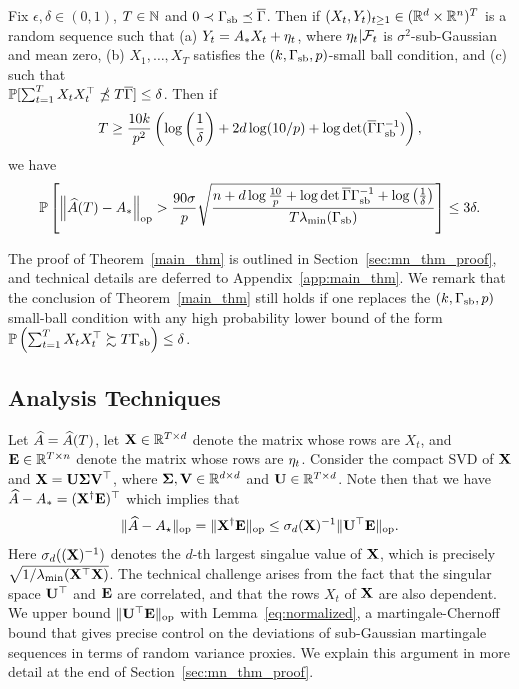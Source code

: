 \begin{thm}\label{main_thm} Fix $\epsilon, \delta \in (0,1)$, $T \in \mathbb{N}$ and $0 \prec \Gamma_{\mathrm{sb}} \preceq \overline{\Gamma}$. Then if $(X_t,Y_t)_{t \ge 1} \in (\mathbb{R}^d \times \mathbb{R}^n)^{T}$ is a random sequence such that (a) $Y_t = A_{*} X_t + \eta_t$, where $\eta_t | \mathcal{F}_t$ is $\sigma^2$-sub-Gaussian and mean zero, (b) $X_1,\dots,X_T$ satisfies the $(k,\Gamma_{\mathrm{sb}},p)$-small ball condition, and (c) such that\\ $\mathbb{P}[\sum_{t = 1}^T X_t X_t^\top \npreceq T\overline{\Gamma}] \le \delta$. Then if 
\begin{align}\label{eq:main_thm_condition}
T \geq  \frac{10k}{p^2}\left(\log \left(\frac{1}{\delta}\right) + 2d\log(10/ p) +  \log \det (\overline{\Gamma} \Gamma_{\mathrm{sb}}^{-1}) \right),
\end{align}
we have
\begin{align}
\mathbb{P}\left[\left\lVert \widehat{A}(T)-A_{*} \right\rVert_{\mathrm{op}} >\frac{90\sigma}{p}\sqrt{\frac{n + d\log \frac{10}{p} + \log \det \overline{\Gamma} \Gamma_{\mathrm{sb}}^{-1} + \log\left(\frac{1}{\delta}\right)}{T\lambda_{\min}(\Gamma_{\mathrm{sb}})}} \right] \le  3\delta.
\end{align}
\end{thm}
The proof of Theorem~\ref{main_thm} is outlined in Section~\ref{sec:mn_thm_proof}, and technical details are deferred to Appendix~\ref{app:main_thm}. We remark that the conclusion of Theorem~\ref{main_thm} still holds if one replaces the $(k,\Gamma_{\mathrm{sb}},p)$ small-ball condition with any high probability lower bound of the form $\mathbb{P}\left( \sum_{t = 1}^T X_t X_t^\top \succsim T \Gamma_{\mathrm{sb}} \right) \leq \delta$.

\subsection{Analysis Techniques\label{sec:analysis_tech}}
Let $\widehat{A} = \widehat{A}(T)$, let $\mathbf{X} \in \mathbb{R}^{T \times d}$ denote the matrix whose rows are $X_t$, and $\mathbf{E} \in \mathbb{R}^{T \times n}$ denote the matrix
whose rows are $\eta_t$.  Consider the compact SVD of $\mathbf{X}$ and
$\mathbf{X} = \mathbf{U} \mathbf{\Sigma} \mathbf{V}^\top$, where $\mathbf{\Sigma},\mathbf{V} \in \mathbb{R}^{d \times d}$
and $\mathbf{U} \in \mathbb{R}^{T \times d}$. Note then that we have $\widehat{A} - A_* =
(\mathbf{X}^{\dagger} \mathbf{E})^\top $ which implies that
\begin{eqnarray}\label{eq:error_decomp}
\lVert \widehat{A} - A_\star \rVert_{\mathrm{op}}  = \lVert \mathbf{X}^{\dagger} \mathbf{E} \rVert_{\mathrm{op}} \leq \sigma_{d}(\mathbf{X})^{-1}\lVert \mathbf{U}^{\top}\mathbf{E} \rVert_{\mathrm{op}}.
\end{eqnarray}
Here $\sigma_{d}((\mathbf{X})^{-1})$ denotes the $d$-th largest singalue value of $\mathbf{X}$, which is precisely $\sqrt{1/\lambda_{\min}(\mathbf{X}^\top \mathbf{X})}$.
The technical challenge arises from the fact that the singular space $\mathbf{U}^{\top}$ and $\mathbf{E}$ are correlated, and that the rows $X_t$ of $\mathbf{X}$ are also dependent. We upper bound $\lVert \mathbf{U}^{\top}\mathbf{E} \rVert_{\mathrm{op}}$ with Lemma~\ref{eq:normalized}, a martingale-Chernoff bound that gives precise control on the deviations of sub-Gaussian martingale sequences in terms of random variance proxies. We explain this argument in more detail at the end of Section~\ref{sec:mn_thm_proof}.

